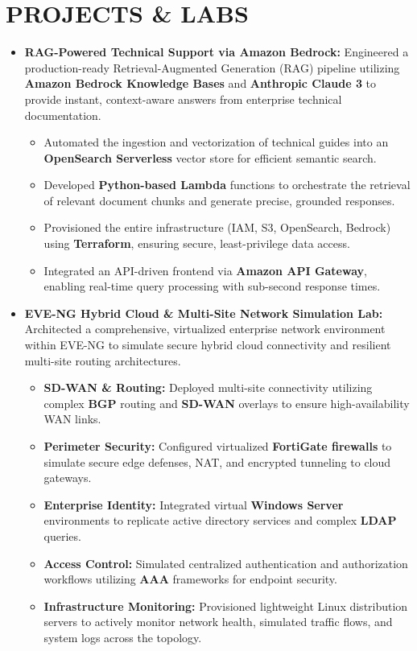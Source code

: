 \documentclass[10pt,a4paper]{article}
\begin{document}
\section*{PROJECTS \& LABS}
\begin{itemize}[label={\color{teal}\textbullet},leftmargin=*,itemsep=3pt,parsep=1pt,topsep=1pt]
    \item \textbf{RAG-Powered Technical Support via Amazon Bedrock:} Engineered a production-ready Retrieval-Augmented Generation (RAG) pipeline utilizing \textbf{Amazon Bedrock Knowledge Bases} and \textbf{Anthropic Claude 3} to provide instant, context-aware answers from enterprise technical documentation.
    \begin{itemize}[label={--},leftmargin=*,itemsep=1pt,parsep=0pt,topsep=1pt]
        \item Automated the ingestion and vectorization of technical guides into an \textbf{OpenSearch Serverless} vector store for efficient semantic search.
        \item Developed \textbf{Python-based Lambda} functions to orchestrate the retrieval of relevant document chunks and generate precise, grounded responses.
        \item Provisioned the entire infrastructure (IAM, S3, OpenSearch, Bedrock) using \textbf{Terraform}, ensuring secure, least-privilege data access.
        \item Integrated an API-driven frontend via \textbf{Amazon API Gateway}, enabling real-time query processing with sub-second response times.
    \end{itemize}
    \item \textbf{EVE-NG Hybrid Cloud \& Multi-Site Network Simulation Lab:} Architected a comprehensive, virtualized enterprise network environment within EVE-NG to simulate secure hybrid cloud connectivity and resilient multi-site routing architectures.
    \begin{itemize}[label={--},leftmargin=*,itemsep=1pt,parsep=0pt,topsep=1pt]
        \item \textbf{SD-WAN \& Routing:} Deployed multi-site connectivity utilizing complex \textbf{BGP} routing and \textbf{SD-WAN} overlays to ensure high-availability WAN links.
        \item \textbf{Perimeter Security:} Configured virtualized \textbf{FortiGate firewalls} to simulate secure edge defenses, NAT, and encrypted tunneling to cloud gateways.
        \item \textbf{Enterprise Identity:} Integrated virtual \textbf{Windows Server} environments to replicate active directory services and complex \textbf{LDAP} queries.
        \item \textbf{Access Control:} Simulated centralized authentication and authorization workflows utilizing \textbf{AAA} frameworks for endpoint security.
        \item \textbf{Infrastructure Monitoring:} Provisioned lightweight Linux distribution servers to actively monitor network health, simulated traffic flows, and system logs across the topology.
    \end{itemize}
\end{itemize}
\end{document}
